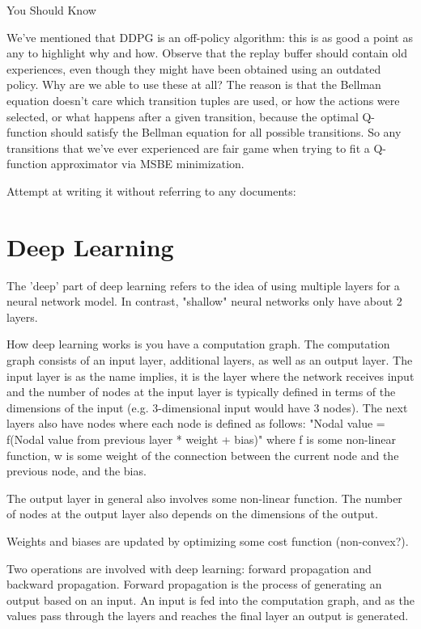 You Should Know

We've mentioned that DDPG is an off-policy algorithm: this is as good a point as any to highlight why and how. Observe that the replay buffer should contain old experiences, even though they might have been obtained using an outdated policy. Why are we able to use these at all? The reason is that the Bellman equation doesn't care which transition tuples are used, or how the actions were selected, or what happens after a given transition, because the optimal Q-function should satisfy the Bellman equation for all possible transitions. So any transitions that we've ever experienced are fair game when trying to fit a Q-function approximator via MSBE minimization.




Attempt at writing it without referring to any documents:
\section{Deep Learning}
The 'deep' part of deep learning refers to the idea of using multiple layers for a neural network model. In contrast, "shallow" neural networks only have about 2 layers.

How deep learning works is you have a computation graph. The computation graph consists of an input layer, additional layers, as well as an output layer. The input layer is as the name implies, it is the layer where the network receives input and the number of nodes at the input layer is typically defined in terms of the dimensions of the input (e.g. 3-dimensional input would have 3 nodes). The next layers also have nodes where each node is defined as follows: "Nodal value = f(Nodal value from previous layer * weight + bias)" where f is some non-linear function, w is some weight of the connection between the current node and the previous node, and the bias.

The output layer in general also involves some non-linear function. The number of nodes at the output layer also depends on the dimensions of the output.

Weights and biases are updated by optimizing some cost function (non-convex?).

Two operations are involved with deep learning: forward propagation and backward propagation. Forward propagation is the process of generating an output based on an input. An input is fed into the computation graph, and as the values pass through the layers and reaches the final layer an output is generated.

